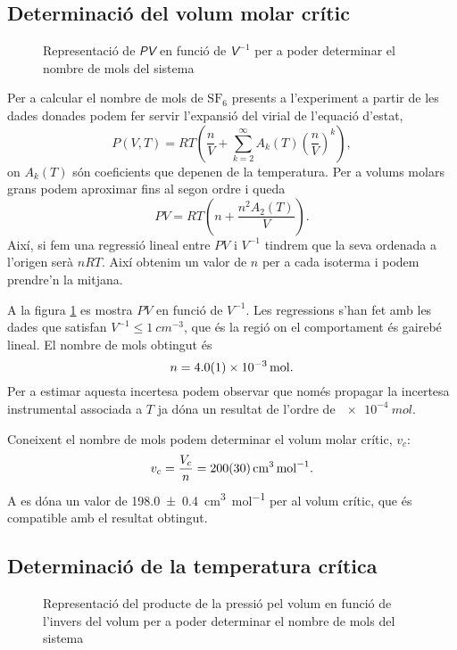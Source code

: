 \documentclass[12pt]{article}
\numberwithin{table}{section}
\numberwithin{figure}{section}
\numberwithin{equation}{section}
\newcommand{\data}[3]{\SI{#1 \pm #2}{#3}}
\begin{document}
\subsection{Determinació del volum molar crític} \label{sec:mols}
\begin{figure}[htb]
	\small \sffamily \centering
	
	\caption{Representació de \( \mathsfit{PV} \) en funció de \( \mathsfit{V^{-1}} \) per a poder determinar el nombre de mols del sistema}
	\label{fig:pvs}
\end{figure}

Per a calcular el nombre de mols de \( \mathrm{SF}_6 \) presents a l'experiment a partir de les dades donades podem fer servir l'expansió del virial de l'equació d'estat,
\begin{equation*}
	P(V, T) = RT \left( \frac{n}{V} + \sum_{k = 2}^\infty A_k(T) \left(\frac{n}{V}\right)^k\right),
\end{equation*}
on \( A_k(T) \) són coeficients que depenen de la temperatura. Per a volums molars grans podem aproximar fins al segon ordre i queda
\begin{equation*}
	PV = RT\left(n + \frac{n^2A_2(T)}{V}\right). 
\end{equation*}
Així, si fem una regressió lineal entre \( PV \) i \( V^{-1} \) tindrem que la seva ordenada a l'origen serà \( nRT \). Així obtenim un valor de \( n \) per a cada isoterma i podem prendre'n la mitjana. 

A la figura \cref{fig:pvs} es mostra \( PV \) en funció de \( V^{-1} \). Les regressions s'han fet amb les dades que satisfan \( V^{-1} \leq \SI{1}{cm^{-3}} \), que és la regió on el comportament és gairebé lineal. El nombre de mols obtingut és 
\begin{equation*}
	n = \data{4.0}{0.1e-3}{mol}.
\end{equation*}
Per a estimar aquesta incertesa podem observar que només propagar la incertesa instrumental associada a \( T \) ja dóna un resultat de l'ordre de \( \SI{e-4}{mol} \). 

Coneixent el nombre de mols podem determinar el volum molar crític, \( v_c \):
\begin{equation*}
 	v_c = \frac{V_c}{n} = \data{200}{30}{cm^3.mol^{-1}}.
\end{equation*}
A \cite{nist} es dóna un valor de \data{198.0}{0.4}{cm^3 . mol^{-1}} per al volum crític, que és compatible amb el resultat obtingut. 

\subsection{Determinació de la temperatura crítica}
\begin{figure}[htb]
	\small \sffamily \centering
	
	\caption{Representació del producte de la pressió pel volum en funció de l'invers del volum per a poder determinar el nombre de mols del sistema}
	\label{fig:pts}
\end{figure}
\end{document}
